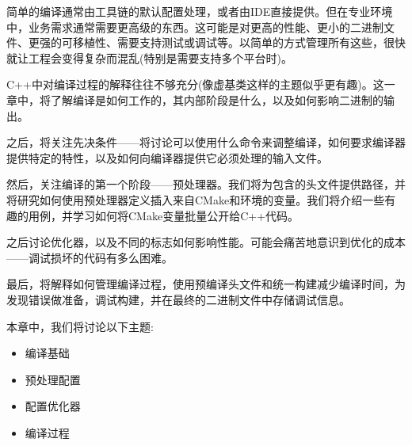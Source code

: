 简单的编译通常由工具链的默认配置处理，或者由IDE直接提供。但在专业环境中，业务需求通常需要更高级的东西。这可能是对更高的性能、更小的二进制文件、更强的可移植性、需要支持测试或调试等。以简单的方式管理所有这些，很快就让工程会变得复杂而混乱(特别是需要支持多个平台时)。

C++中对编译过程的解释往往不够充分(像虚基类这样的主题似乎更有趣)。这一章中，将了解编译是如何工作的，其内部阶段是什么，以及如何影响二进制的输出。

之后，将关注先决条件——将讨论可以使用什么命令来调整编译，如何要求编译器提供特定的特性，以及如何向编译器提供它必须处理的输入文件。

然后，关注编译的第一个阶段——预处理器。我们将为包含的头文件提供路径，并将研究如何使用预处理器定义插入来自CMake和环境的变量。我们将介绍一些有趣的用例，并学习如何将CMake变量批量公开给C++代码。

之后讨论优化器，以及不同的标志如何影响性能。可能会痛苦地意识到优化的成本——调试损坏的代码有多么困难。

最后，将解释如何管理编译过程，使用预编译头文件和统一构建减少编译时间，为发现错误做准备，调试构建，并在最终的二进制文件中存储调试信息。

本章中，我们将讨论以下主题:

\begin{itemize}
\item 
编译基础

\item 
预处理配置

\item 
配置优化器

\item 
编译过程
\end{itemize}